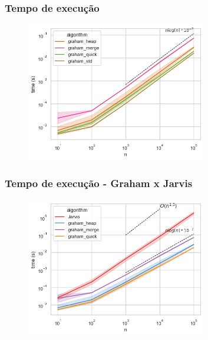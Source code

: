\documentclass[aspectratio=169,usenames,dvipsnames]{beamer}
\begin{document}
\begin{frame}
\frametitle{Tempo de execução}
    \begin{figure}
        \includegraphics[width=0.7\textwidth]{./figures/circle_times_nlogn.png}
    \end{figure}
\end{frame}

\begin{frame}
\frametitle{Tempo de execução - Graham x Jarvis}
    \begin{figure}
      \includegraphics[width=0.7\textwidth]{./figures/circle_times_2.png}
    \end{figure}
\end{frame}
\end{document}
